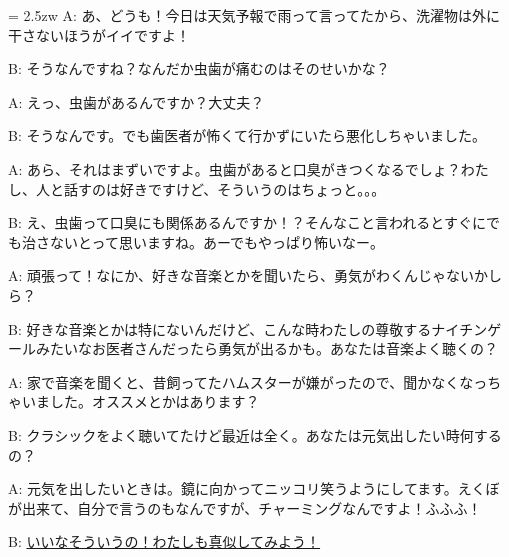 \documentclass[11pt]{amsart}
\title{}
\author{}
\newenvironment{hangall}[1]{\hangindent = 2.5zw\everypar{\hangindent = 2.5zw}}{}
\begin{document}
\maketitle
\begin{hangall}{}%
A: あ、どうも！今日は天気予報で雨って言ってたから、洗濯物は外に干さないほうがイイですよ！

B: そうなんですね？なんだか虫歯が痛むのはそのせいかな？

A: えっ、虫歯があるんですか？大丈夫？

B: そうなんです。でも歯医者が怖くて行かずにいたら悪化しちゃいました。

A: あら、それはまずいですよ。虫歯があると口臭がきつくなるでしょ？わたし、人と話すのは好きですけど、そういうのはちょっと。。。

B: え、虫歯って口臭にも関係あるんですか！？そんなこと言われるとすぐにでも治さないとって思いますね。あーでもやっぱり怖いなー。

A: 頑張って！なにか、好きな音楽とかを聞いたら、勇気がわくんじゃないかしら？

B: 好きな音楽とかは特にないんだけど、こんな時わたしの尊敬するナイチンゲールみたいなお医者さんだったら勇気が出るかも。あなたは音楽よく聴くの？

A: 家で音楽を聞くと、昔飼ってたハムスターが嫌がったので、聞かなくなっちゃいました。オススメとかはあります？

B: クラシックをよく聴いてたけど最近は全く。あなたは元気出したい時何するの？

A: 元気を出したいときは。鏡に向かってニッコリ笑うようにしてます。えくぼが出来て、自分で言うのもなんですが、チャーミングなんですよ！ふふふ！

B: \ul{いいなそういうの！わたしも真似してみよう！}\end{hangall}
\end{document}
